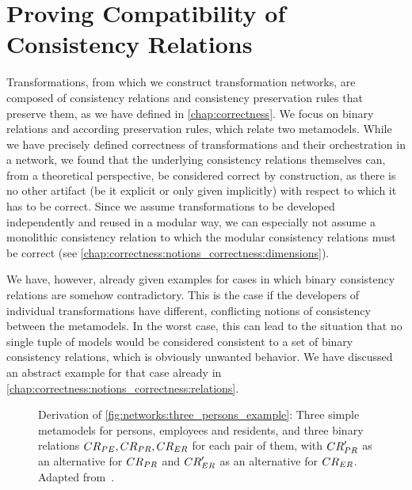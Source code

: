 \chapter{Proving Compatibility of Consistency Relations
}
\label{chap:compatibility}

Transformations, from which we construct transformation networks, are composed of consistency relations and consistency preservation rules that preserve them, as we have defined in \autoref{chap:correctness}.
We focus on binary relations and according preservation rules, which relate two metamodels.
While we have precisely defined correctness of transformations and their orchestration in a network, we found that the underlying consistency relations themselves can, from a theoretical perspective, be considered correct by construction, as there is no other artifact (be it explicit or only given implicitly) with respect to which it has to be correct.
Since we assume transformations to be developed independently and reused in a modular way, we can especially not assume a monolithic consistency relation to which the modular consistency relations must be correct (see \autoref{chap:correctness:notions_correctness:dimensions}).

We have, however, already given examples for cases in which binary consistency relations are somehow contradictory.
This is the case if the developers of individual transformations have different, conflicting notions of consistency between the metamodels.
In the worst case, this can lead to the situation that no single tuple of models would be considered consistent to a set of binary consistency relations, which is obviously unwanted behavior.
We have discussed an abstract example for that case already in \autoref{chap:correctness:notions_correctness:relations}.

\begin{figure}
    \centering
    
    \caption[Three metamodels with (in-)compatible consistency relations]{Derivation of \autoref{fig:networks:three_persons_example}: Three simple metamodels for persons, employees and residents, and three binary relations $\consistencyrelation{CR}{PE}, \consistencyrelation{CR}{PR}, \consistencyrelation{CR}{ER}$ for each pair of them, with $\consistencyrelation{CR}{PR}'$ as an alternative for $\consistencyrelation{CR}{PR}$ and $\consistencyrelation{CR}{ER}'$ as an alternative for $\consistencyrelation{CR}{ER}$. Adapted from~.}
    \label{fig:compatibility:three_persons_example_extended}
\end{figure}

